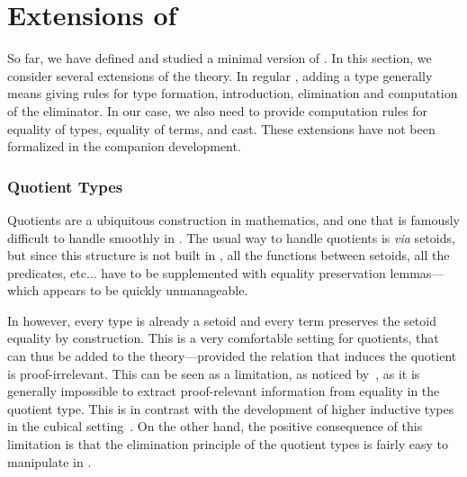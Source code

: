 \setchapterpreamble[u]{\margintoc}
\chapter{Extensions of \SetoidCC}


So far, we have defined and studied a minimal version of \SetoidTT.
%
In this section, we consider several extensions of the theory.
%
In regular \MLTT, adding a type generally means giving rules for type
formation, introduction, elimination and computation of the
eliminator. In our case, we also need to provide computation rules for
equality of types, equality of terms, and cast. These extensions have
not been formalized in the companion \Agda development.

\subsection{Quotient Types}

Quotients are a ubiquitous construction in mathematics, and one that
is famously difficult to handle smoothly in \MLTT.
%
The usual way to handle quotients is \textit{via} setoids, but since
this structure is not built in \MLTT, all the functions between
setoids, all the predicates, etc... have to be supplemented with
equality preservation lemmas---which appears to be quickly unmanageable.

In \SetoidTT however, every type is already a setoid and every term
preserves the setoid equality by construction. This is a very
comfortable setting for quotients, that can thus be added to the
theory---provided the relation that induces the quotient is
proof-irrelevant.
%
This can be seen as a limitation, as noticed
by~, as it is generally
impossible to extract proof-relevant information from equality in
the quotient type. This is in contrast with the development of higher
inductive types in the cubical setting~.
%
On the other hand, the positive consequence of this limitation is
that the elimination principle of the quotient types is fairly easy to
manipulate in \SetoidTT.

